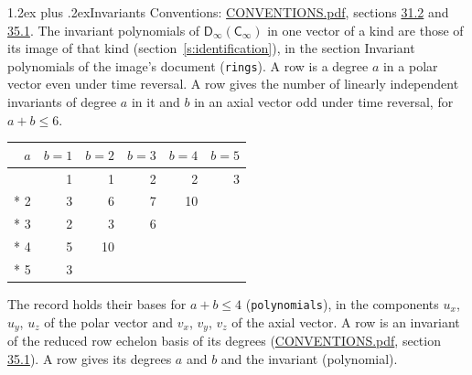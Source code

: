 \documentclass[10pt,a4paper]{article}
\makeatletter
\renewcommand\section{\@startsection{section}{1}{\z@}{-3ex plus -1ex minus -.2ex}%
  {1.2ex plus .2ex}{\normalfont\large\sffamily\bfseries\color{parttitle}}}
\numberwithin{equation}{section}
\newcommand{\grp}[1]{\mathsf{#1}}
\makeatother
\begin{document}
\section{Invariants}\label{s:invariants}
Conventions: \href{../../CONVENTIONS.pdf}{CONVENTIONS.pdf}, sections \href{../../CONVENTIONS.pdf\#conv.31.2}{31.2} and \href{../../CONVENTIONS.pdf\#conv.35.1}{35.1}.
The invariant polynomials of $\grp{D_{\infty}}(\grp{C_{\infty}})$ in one vector of a kind are those of its image of that kind (section~\ref{s:identification}), in the section Invariant polynomials of the image's document (\texttt{rings}).
\leavevmode\label{n:index.degree.polar}\label{n:index.degree.axial}A row is a degree $a$ in a polar vector even under time reversal. A row gives the number of linearly independent invariants of degree $a$ in it and $b$ in an axial vector odd under time reversal, for $a + b \le 6$.
{\small\begin{longtable}{@{}rrrrrr@{}}\toprule
$a$ & $b = 1$ & $b = 2$ & $b = 3$ & $b = 4$ & $b = 5$\\\midrule\endhead
\bottomrule\endfoot\endlastfoot
1 & 1 & 1 & 2 & 2 & 3\\*
2 & 3 & 6 & 7 & 10 & \\*
3 & 2 & 3 & 6 &  & \\*
4 & 5 & 10 &  &  & \\*
5 & 3 &  &  &  & \\
\bottomrule\end{longtable}}
\leavevmode\label{n:local.component.polar}\label{n:local.component.axial}The record holds their bases for $a + b \le 4$ (\texttt{polynomials}), in the components $u_{x}$, $u_{y}$, $u_{z}$ of the polar vector and $v_{x}$, $v_{y}$, $v_{z}$ of the axial vector. \label{n:head.polynomial}A row is an invariant of the reduced row echelon basis of its degrees (\href{../../CONVENTIONS.pdf}{CONVENTIONS.pdf}, section \href{../../CONVENTIONS.pdf\#conv.35.1}{35.1}). A row gives its degrees $a$ and $b$ and the invariant (polynomial).
\end{document}
